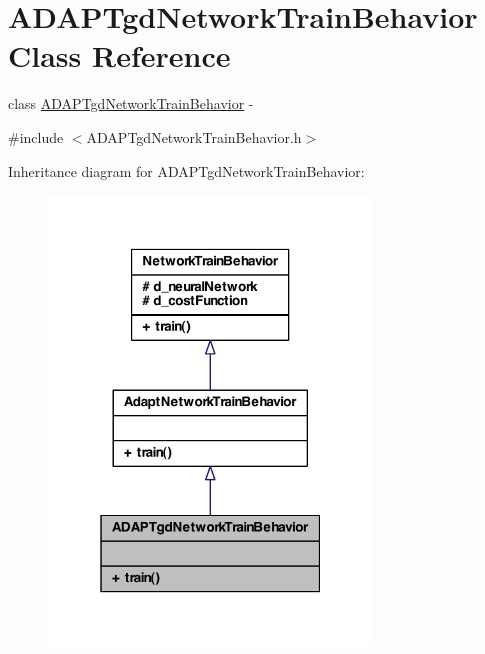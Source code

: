 \hypertarget{class_a_d_a_p_tgd_network_train_behavior}{
\section{ADAPTgdNetworkTrainBehavior Class Reference}
\label{class_a_d_a_p_tgd_network_train_behavior}
}


class \hyperlink{class_a_d_a_p_tgd_network_train_behavior}{ADAPTgdNetworkTrainBehavior} -\/  




{\ttfamily \#include $<$ADAPTgdNetworkTrainBehavior.h$>$}



Inheritance diagram for ADAPTgdNetworkTrainBehavior:
\nopagebreak
\begin{figure}[H]
\begin{center}
\leavevmode
\includegraphics[width=244pt]{class_a_d_a_p_tgd_network_train_behavior__inherit__graph}
\end{center}
\end{figure}


